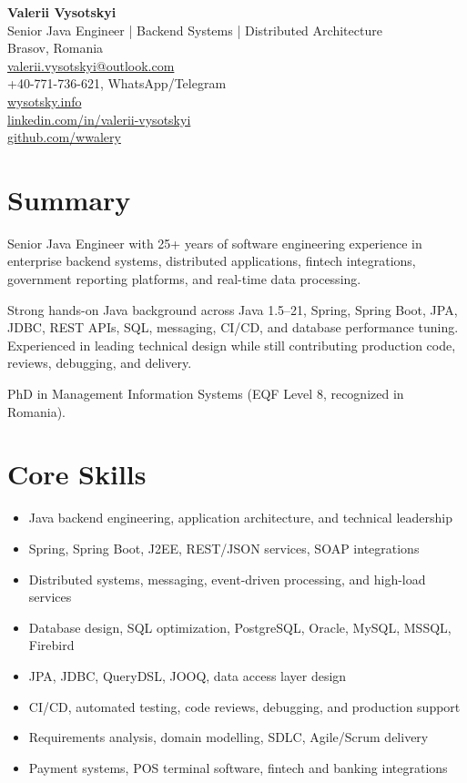 \documentclass[10pt,a4paper]{article}
\begin{document}
{\LARGE \textbf{Valerii Vysotskyi}} \\[4pt]
\textcolor{accent}{Senior Java Engineer | Backend Systems | Distributed Architecture} \\[6pt]

Brasov, Romania \\
\href{mailto:valerii.vysotskyi@outlook.com}{valerii.vysotskyi@outlook.com} \\
+40-771-736-621, WhatsApp/Telegram \\
\href{https://wysotsky.info}{wysotsky.info} \\
\href{https://linkedin.com/in/valerii-vysotskyi}{linkedin.com/in/valerii-vysotskyi} \\
\href{https://github.com/wwalery}{github.com/wwalery}

\vspace{6pt}

\section*{Summary}

Senior Java Engineer with 25+ years of software engineering experience in enterprise backend systems, distributed applications, fintech integrations, government reporting platforms, and real-time data processing.

Strong hands-on Java background across Java 1.5--21, Spring, Spring Boot, JPA, JDBC, REST APIs, SQL, messaging, CI/CD, and database performance tuning. Experienced in leading technical design while still contributing production code, reviews, debugging, and delivery.

PhD in Management Information Systems (EQF Level 8, recognized in Romania).

\section*{Core Skills}

\begin{itemize}
\item Java backend engineering, application architecture, and technical leadership
\item Spring, Spring Boot, J2EE, REST/JSON services, SOAP integrations
\item Distributed systems, messaging, event-driven processing, and high-load services
\item Database design, SQL optimization, PostgreSQL, Oracle, MySQL, MSSQL, Firebird
\item JPA, JDBC, QueryDSL, JOOQ, data access layer design
\item CI/CD, automated testing, code reviews, debugging, and production support
\item Requirements analysis, domain modelling, SDLC, Agile/Scrum delivery
\item Payment systems, POS terminal software, fintech and banking integrations
\end{itemize}
\end{document}
